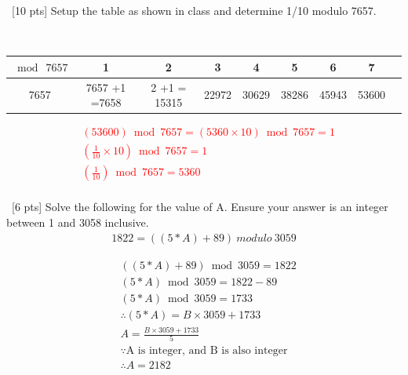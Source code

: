 \documentclass[12pt]{article}
\newenvironment{sol}[1][Solution]{\begin{trivlist}\item[\hskip\labelsep {\bfseries #1:}]}{\end{trivlist}}
\begin{document}
\begin{enumerate}
    \item \ [10 pts] Setup the table as shown in class and determine 1/10 modulo 7657.
    \begin{sol}
        \hspace*{\fill} \\
        \begin{center}
            \begin{tabular}{|c|c|c|c|c|c|c|c|c|}
                 \hline
                 $\bmod \ 7657$ & 1 & 2 & 3 & 4 & 5 & 6 & 7  \\
                 \hline
                    7657  &  7657 +1 =7658& 2 \times 7657+1 = 15315 &22972 &  30629 & 38286 & 45943 & 53600  \\
                 \hline
            \end{tabular}
        \end{center}
        \textcolor{red}{
        \begin{align*}
            & (53600) \bmod 7657 = (5360 \times 10 ) \bmod 7657 = 1 \\
            & (\frac{1}{10} \times 10 ) \bmod 7657 = 1  \\ 
            & (\frac{1}{10}) \bmod 7657 = 5360 \\
            & 
        \end{align*}
        }
    \end{sol}

    \item \ [6 pts] Solve the following for the value of A. Ensure your answer is an integer between 1 and 3058 inclusive.
    \begin{align*}
        1822 = ((5*A) + 89) \ modulo \ 3059
    \end{align*}
    \begin{sol}
    \begin{align*}
        & ((5*A) + 89) \bmod  3059 = 1822 \\
        & (5 * A) \bmod 3059 = 1822 - 89 \\
        & (5 * A) \bmod 3059 = 1733 \\ 
        & \therefore (5*A) = B \times 3059 + 1733 \\
             &  A = \frac{B\times 3059 +1733}{5} \\
             & \because \text{A is integer, and B is also integer} \\
             & \therefore A = 2182
    \end{align*}
    \end{sol}


\end{enumerate}
\end{document}
